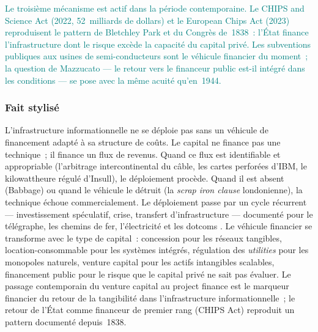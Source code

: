 \textcolor{teal}{Le troisième mécanisme est actif dans la période contemporaine. Le CHIPS and Science Act (2022, 52~milliards de dollars) et le European Chips Act (2023) reproduisent le pattern de Bletchley Park et du Congrès de~1838~: l'État finance l'infrastructure dont le risque excède la capacité du capital privé. Les subventions publiques aux usines de semi-conducteurs sont le véhicule financier du moment~; la question de Mazzucato --- le retour vers le financeur public est-il intégré dans les conditions --- se pose avec la même acuité qu'en~1944.}



\subsubsection{Fait stylisé}

L'infrastructure informationnelle ne se déploie pas sans un véhicule de financement adapté à sa structure de coûts. Le capital ne finance pas une technique~; il finance un flux de revenus. Quand ce flux est identifiable et appropriable (l'arbitrage intercontinental du câble, les cartes perforées d'IBM, le kilowattheure régulé d'Insull), le déploiement procède. Quand il est absent (Babbage) ou quand le véhicule le détruit (la \emph{scrap iron clause} londonienne), la technique échoue commercialement. Le déploiement passe par un cycle récurrent --- investissement spéculatif, crise, transfert d'infrastructure --- documenté pour le télégraphe, les chemins de fer, l'électricité et les dotcoms \parencite{perez_technological_2002, nonnenmacher_telegraph_2001, reinhart_this_2009}. Le véhicule financier se transforme avec le type de capital~: concession pour les réseaux tangibles, location-consommable pour les systèmes intégrés, régulation des \emph{utilities} pour les monopoles naturels, venture capital pour les actifs intangibles scalables, financement public pour le risque que le capital privé ne sait pas évaluer. Le passage contemporain du venture capital au project finance est le marqueur financier du retour de la tangibilité dans l'infrastructure informationnelle~; le retour de l'État comme financeur de premier rang (CHIPS Act) reproduit un pattern documenté depuis~1838.

